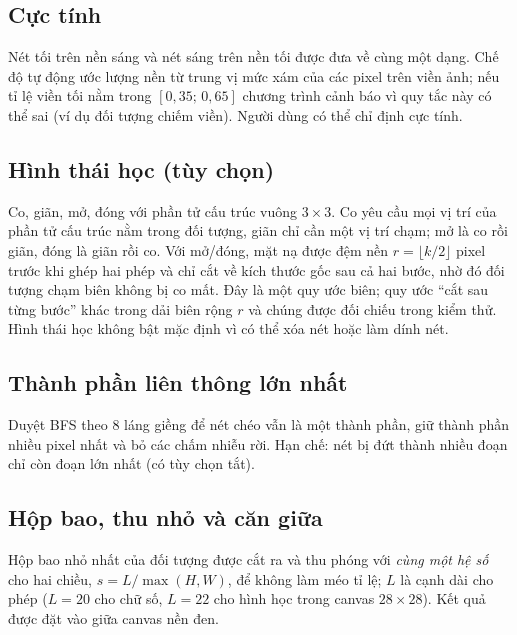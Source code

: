 \subsection{Cực tính}
Nét tối trên nền sáng và nét sáng trên nền tối được đưa về cùng một dạng. Chế độ tự động ước lượng nền từ trung vị mức xám của các pixel trên viền ảnh;
nếu tỉ lệ viền tối nằm trong $[0{,}35;\,0{,}65]$ chương trình cảnh báo vì quy tắc này có thể sai (ví dụ đối tượng chiếm viền). Người dùng có thể chỉ định cực tính.

\subsection{Hình thái học (tùy chọn)}
Co, giãn, mở, đóng với phần tử cấu trúc vuông $3\times3$. Co yêu cầu mọi vị trí của phần tử cấu trúc nằm trong đối tượng, giãn chỉ cần một vị trí chạm;
mở là co rồi giãn, đóng là giãn rồi co. Với mở/đóng, mặt nạ được đệm nền $r=\lfloor k/2\rfloor$ pixel trước khi ghép hai phép và chỉ cắt về kích thước gốc sau cả hai bước,
nhờ đó đối tượng chạm biên không bị co mất. Đây là một quy ước biên; quy ước ``cắt sau từng bước'' khác trong dải biên rộng $r$ và chúng được đối chiếu trong kiểm thử.
Hình thái học không bật mặc định vì có thể xóa nét hoặc làm dính nét.

\subsection{Thành phần liên thông lớn nhất}
Duyệt BFS theo 8 láng giềng để nét chéo vẫn là một thành phần, giữ thành phần nhiều pixel nhất và bỏ các chấm nhiễu rời. Hạn chế: nét bị đứt thành nhiều đoạn
chỉ còn đoạn lớn nhất (có tùy chọn tắt).

\subsection{Hộp bao, thu nhỏ và căn giữa}
Hộp bao nhỏ nhất của đối tượng được cắt ra và thu phóng với \emph{cùng một hệ số} cho hai chiều, $s = L/\max(H,W)$, để không làm méo tỉ lệ; $L$ là cạnh dài cho phép
($L=20$ cho chữ số, $L=22$ cho hình học trong canvas $28\times28$). Kết quả được đặt vào giữa canvas nền đen.

